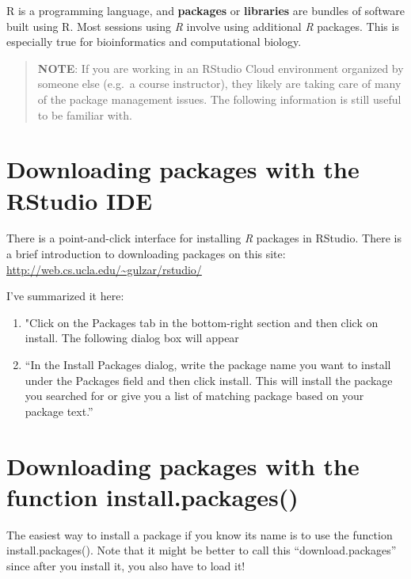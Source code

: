 \documentclass[
]{book}
\providecommand{\tightlist}{%
  \setlength{\itemsep}{0pt}\setlength{\parskip}{0pt}}
\begin{document}
R is a programming language, and \textbf{packages} or \textbf{libraries} are bundles of software built using R. Most sessions using \emph{R} involve using additional \emph{R} packages. This is especially true for bioinformatics and computational biology.

\begin{quote}
\textbf{NOTE}: If you are working in an RStudio Cloud environment organized by someone else (e.g.~a course instructor), they likely are taking care of many of the package management issues. The following information is still useful to be familiar with.
\end{quote}

\hypertarget{downloading-packages-with-the-rstudio-ide}{%
\section{Downloading packages with the RStudio IDE}\label{downloading-packages-with-the-rstudio-ide}}

There is a point-and-click interface for installing \emph{R} packages in RStudio. There is a brief introduction to downloading packages on this site: \url{http://web.cs.ucla.edu/~gulzar/rstudio/}

I've summarized it here:

\begin{enumerate}
\def\labelenumi{\arabic{enumi}.}
\tightlist
\item
  "Click on the Packages tab in the bottom-right section and then click on install. The following dialog box will appear
\item
  ``In the Install Packages dialog, write the package name you want to install under the Packages field and then click install. This will install the package you searched for or give you a list of matching package based on your package text.''
\end{enumerate}

\hypertarget{downloading-packages-with-the-function-install.packages}{%
\section{Downloading packages with the function install.packages()}\label{downloading-packages-with-the-function-install.packages}}

The easiest way to install a package if you know its name is to use the function install.packages(). Note that it might be better to call this ``download.packages'' since after you install it, you also have to load it!
\end{document}
